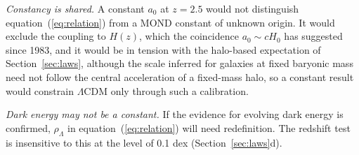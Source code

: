 \documentclass[fleqn,usenatbib]{mnras}
\begin{document}
\emph{Constancy is shared.} A constant $a_0$ at $z=2.5$ would not distinguish equation~(\ref{eq:relation}) from a MOND constant of unknown origin. It would exclude the coupling to $H(z)$, which the coincidence $a_0\sim cH_0$ has suggested since 1983, and it would be in tension with the halo-based expectation of Section~\ref{sec:laws}, although the scale inferred for galaxies at fixed baryonic mass need not follow the central acceleration of a fixed-mass halo, so a constant result would constrain $\Lambda$CDM only through such a calibration.

\emph{Dark energy may not be a constant.} If the evidence for evolving dark energy \citep{DESI2025} is confirmed, $\rho_\Lambda$ in equation~(\ref{eq:relation}) will need redefinition. The redshift test is insensitive to this at the level of 0.1 dex (Section~\ref{sec:laws}d).

\end{document}
